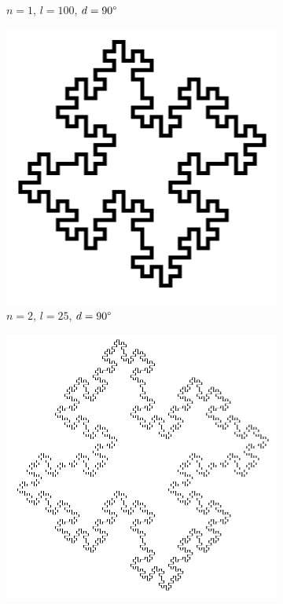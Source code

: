 \begin{figure} [hbtp]
\begin{subfigure}[t]{.4\textwidth}
		\caption{$n=1$, $l=100$, $d=90\degree$}
		\label{fig:KochkurveN1L100}
	\end{subfigure}
	\medskip
	\begin{subfigure}[t]{.4\textwidth}
		\includegraphics[width=\linewidth]{images/KochkurveN2L25.png}
		\caption{$n=2$, $l=25$, $d=90\degree$}
		\label{fig:KochkurveN2L25}
	\end{subfigure}
	\hspace{.1\textwidth}
	\begin{subfigure}[t]{.4\textwidth}
		\centering
		\includegraphics[width=\linewidth]{images/KochkurveN3L6_25.png}

\end{subfigure}
\end{figure}

